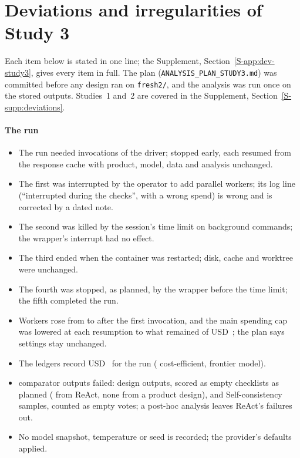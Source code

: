 \section{Deviations and irregularities of Study 3}
\label{app:deviations}


Each item below is stated in one line; the Supplement, Section~\ref{S-app:dev-study3}, gives every item in full. The plan (\texttt{ANALYSIS\_\allowbreak{}PLAN\_\allowbreak{}STUDY3.md}) was committed before any design ran on \texttt{fresh2/}, and the analysis was run once on the stored outputs. Studies~1 and~2 are covered in the Supplement, Section~\ref{S-supp:deviations}.

\paragraph{The run}
\begin{itemize}[leftmargin=1.2em,itemsep=1pt]
\item The run needed \sthreeRunInvocations{} invocations of the driver; \sthreeRunNotComplete{} stopped early, each resumed from the response cache with product, model, data and analysis unchanged.
\item The first was interrupted by the operator to add parallel workers; its log line (``interrupted during the checks'', with a wrong spend) is wrong and is corrected by a dated note.
\item The second was killed by the session's time limit on background commands; the wrapper's interrupt had no effect.
\item The third ended when the container was restarted; disk, cache and worktree were unchanged.
\item The fourth was stopped, as planned, by the wrapper before the time limit; the fifth completed the run.
\item Workers rose from \sthreeRunWorkersFirst{} to \sthreeRunWorkersLater{} after the first invocation, and the main spending cap was lowered at each resumption to what remained of USD~\sthreeRunCapOne; the plan says settings stay unchanged.
\item The ledgers record USD~\sthreeSpendTotal{} for the run (\sthreeSpendLuna{} cost-efficient, \sthreeSpendTerra{} frontier model).
\item \sthreeRunFailedOutputs{} comparator outputs failed: \sthreeFRunFailedDesignOutputs{} design outputs, scored as empty checklists as planned (\sthreeRunFailedReact{} from ReAct, none from a product design), and \sthreeRunFailedSelfCons{} Self-consistency samples, counted as empty votes; a post-hoc analysis leaves ReAct's failures out.
\item No model snapshot, temperature or seed is recorded; the provider's defaults applied.
\end{itemize}

